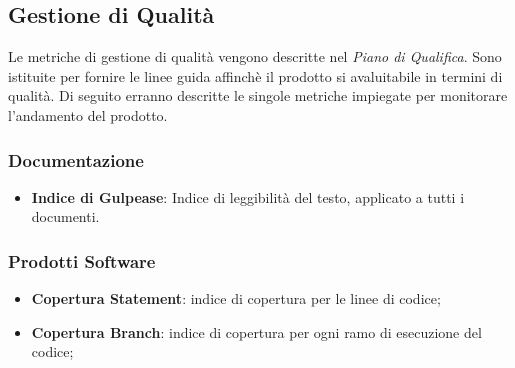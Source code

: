 \documentclass[a4paper, 12pt]{article}
\begin{document}
\subsection{Gestione di Qualità}
Le metriche di gestione di qualità vengono descritte nel \textit{Piano di Qualifica}. Sono istituite per fornire le linee guida affinchè il prodotto si avaluitabile in termini di qualità. Di seguito erranno descritte le singole metriche impiegate per monitorare l'andamento del prodotto.

\subsubsection{Documentazione}
\begin{itemize}
    \item \textbf{Indice di Gulpease}: Indice di leggibilità del testo, applicato a tutti i documenti.
\end{itemize}

\subsubsection{Prodotti Software} 
\begin{itemize}
    \item \textbf{Copertura Statement}: indice di copertura per le linee di codice;
    \item \textbf{Copertura Branch}: indice di copertura per ogni ramo di esecuzione del codice;
\end{itemize}
\end{document}
